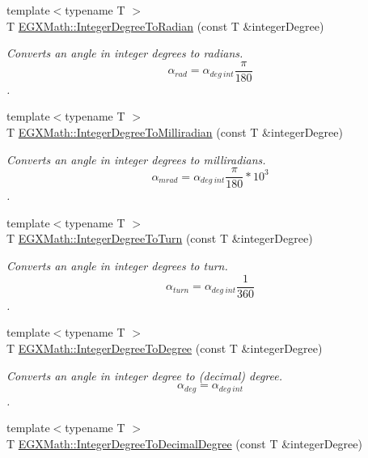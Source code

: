 \begin{DoxyCompactItemize}
\item 
{\footnotesize template$<$typename T $>$ }\\T \mbox{\hyperlink{group___e_g_x_math-_angle_conversions-_integer_degree_ga05d3368b00ea27b9895de2ffe5c8df38}{E\+G\+X\+Math\+::\+Integer\+Degree\+To\+Radian}} (const T \&integer\+Degree)
\begin{DoxyCompactList}\small\item\em Converts an angle in integer degrees to radians. \[\alpha_{rad}=\alpha_{deg\ int}\frac{\pi}{180}\]. \end{DoxyCompactList}\item 
{\footnotesize template$<$typename T $>$ }\\T \mbox{\hyperlink{group___e_g_x_math-_angle_conversions-_integer_degree_ga5379a68bdff5cc4fab5bb1ba06ef9453}{E\+G\+X\+Math\+::\+Integer\+Degree\+To\+Milliradian}} (const T \&integer\+Degree)
\begin{DoxyCompactList}\small\item\em Converts an angle in integer degrees to milliradians. \[\alpha_{mrad}=\alpha_{deg\ int}\frac{\pi}{180}*10^3\]. \end{DoxyCompactList}\item 
{\footnotesize template$<$typename T $>$ }\\T \mbox{\hyperlink{group___e_g_x_math-_angle_conversions-_integer_degree_ga06ddbdada5a3978105c855d4aae735ae}{E\+G\+X\+Math\+::\+Integer\+Degree\+To\+Turn}} (const T \&integer\+Degree)
\begin{DoxyCompactList}\small\item\em Converts an angle in integer degrees to turn. \[\alpha_{turn}=\alpha_{deg\ int}\frac{1}{360}\]. \end{DoxyCompactList}\item 
{\footnotesize template$<$typename T $>$ }\\T \mbox{\hyperlink{group___e_g_x_math-_angle_conversions-_integer_degree_gaa9b63c6095fd7f8809fcfa2ba1e62235}{E\+G\+X\+Math\+::\+Integer\+Degree\+To\+Degree}} (const T \&integer\+Degree)
\begin{DoxyCompactList}\small\item\em Converts an angle in integer degree to (decimal) degree. \[\alpha_{deg}=\alpha_{deg\ int}\]. \end{DoxyCompactList}\item 
{\footnotesize template$<$typename T $>$ }\\T \mbox{\hyperlink{group___e_g_x_math-_angle_conversions-_integer_degree_gac219c3198508ba984d8d81d22831b27d}{E\+G\+X\+Math\+::\+Integer\+Degree\+To\+Decimal\+Degree}} (const T \&integer\+Degree)

\end{DoxyCompactItemize}
